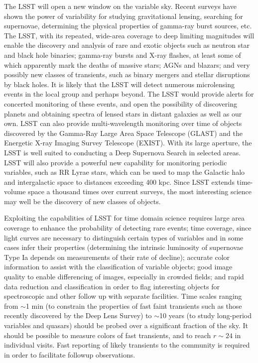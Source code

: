 The LSST will open a new window on the variable sky. Recent surveys have
shown the power of variability for studying gravitational lensing,
searching for supernovae, determining the physical properties of gamma-ray
burst sources, etc. The LSST, with its repeated, wide-area coverage to deep
limiting magnitudes will enable the discovery and analysis of rare and
exotic objects such as neutron star and black hole binaries; gamma-ray
bursts and X-ray flashes, at least some of which apparently mark the deaths
of massive stars; AGNs and blazars; and very possibly new classes of
transients, such as binary mergers and stellar disruptions by black holes.
It is likely that the LSST will detect
numerous microlensing events in the local group and perhaps beyond.  The
LSST would provide alerts for concerted monitoring of these events, and
open the possibility of discovering planets and obtaining spectra of lensed
stars in distant galaxies as well as our own.  LSST can also provide
multi-wavelength monitoring over time of objects discovered by the
Gamma-Ray Large Area Space Telescope (GLAST) and the Energetic X-ray
Imaging Survey Telescope (EXIST). With its large aperture, the LSST is well
suited to conducting a Deep Supernova Search in selected areas.  LSST will
also provide a powerful new capability for monitoring periodic variables,
such as RR Lyrae stars, which can be used to map the Galactic halo and
intergalactic space to distances exceeding 400 kpc. Since LSST extends
time-volume space a thousand times over current surveys, the most
interesting science may well be the discovery of new classes of objects.

Exploiting the capabilities of LSST for time domain science requires large
area coverage to enhance the probability of detecting rare events; time
coverage, since light curves are necessary to distinguish certain types of
variables and in some cases infer their properties (\eg determining the
intrinsic luminosity of supernovae Type Ia depends on measurements of their
rate of decline); accurate color information to assist with the
classification of variable objects; good image quality to enable
differencing of images, especially in crowded fields; and rapid data
reduction and classification in order to flag interesting objects for
spectroscopic and other follow up with separate facilities. Time scales
ranging from $\sim$1 min (to constrain the properties of fast faint
transients such as those recently discovered by the Deep Lens Survey) to
$\sim$10 years (to study long-period variables and quasars) should be
probed over a significant fraction of the sky. It should be possible to
measure colors of fast transients, and to reach $r \sim 24$ in individual
visits. Fast reporting of likely transients to the community is required in
order to facilitate followup observations.




